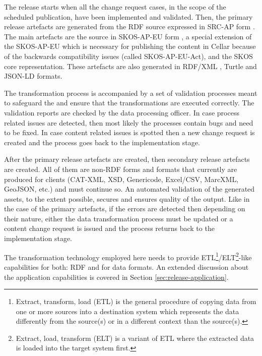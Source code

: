 	The release starts when all the change request cases, in the scope of the scheduled publication, have been implemented and validated. Then, the primary release artefacts are generated from the RDF source expressed in SRC-AP form \citep{src-ap-vb3}. The main artefacts are the source in SKOS-AP-EU form \citep{skos-ap-eu}, a special extension of the SKOS-AP-EU which is necessary for publishing the content in Cellar because of the backwards compatibility issues (called SKOS-AP-EU-Act), and the SKOS core \citep{skos-spec} representation. These artefacts are also generated in RDF/XML \citep{rdf-xml-Schreiber:14:RXS,rdf-xml-Beckett:04:RSS}, Turtle \citep{turtle-Carothers:14:RT} and JSON-LD \citep{sporny2014json,spornyjson} formats. 
	
	The transformation process is accompanied by a set of validation processes meant to safeguard the and ensure that the transformations are executed correctly. The validation reports are checked by the data processing officer. In case process related issues are detected, then most likely the processes contain bugs and need to be fixed. In case content related issues is spotted then a new change request is created and the process goes back to the implementation stage. 
	
	After the primary release artefacts are created, then secondary release artefacts are created. All of them are non-RDF forms and formats that currently are produced for clients (CAT-XML, XSD, Genericode, Excel/CSV, MarcXML, GeoJSON, etc.) and must continue so. An automated validation of the generated assets, to the extent possible, secures and ensures quality of the output. Like in the case of the primary artefacts, if the errors are detected then depending on their nature, either the data transformation process must be updated or a content change request is issued and the process returns back to the implementation stage. 
	
	The transformation technology employed here needs to provide ETL\footnote{Extract, transform, load (ETL) is the general procedure of copying data from one or more sources into a destination system which represents the data differently from the source(s) or in a different context than the source(s).}/ELT\footnote{Extract, load, transform (ELT) is a variant of ETL where the extracted data is loaded into the target system first.}-like capabilities for both: RDF and for data formats. An extended discussion about the application capabilities is covered in Section \ref{sec:release-application}.
	
